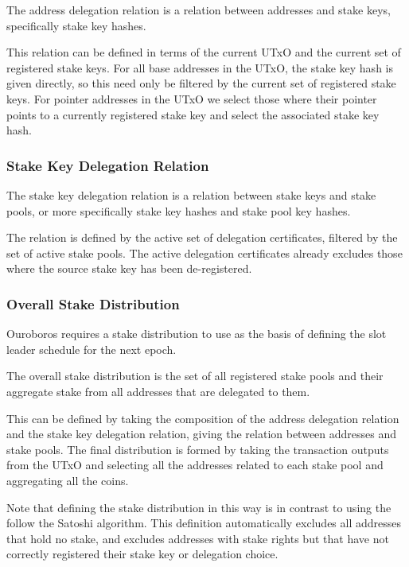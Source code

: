 \documentclass[11pt,a4paper]{article}
\begin{document}
The address delegation relation is a relation between addresses and
stake keys, specifically stake key hashes.

This relation can be defined in terms of the current UTxO and the
current set of registered stake keys. For all base addresses in the
UTxO, the stake key hash is given directly, so this need only be
filtered by the current set of registered stake keys. For pointer
addresses in the UTxO we select those where their pointer points to a
currently registered stake key and select the associated stake key hash.

\subsubsection{Stake Key Delegation Relation}
\label{stake-key-delegation-relation}

The stake key delegation relation is a relation between stake keys and
stake pools, or more specifically stake key hashes and stake pool key
hashes.

The relation is defined by the active set of delegation certificates,
filtered by the set of active stake pools. The active delegation
certificates already excludes those where the source stake key has
been de-registered.

\subsubsection{Overall Stake Distribution}
\label{overall-stake-distribution}

Ouroboros \citep{ouroboros_classic} requires a stake distribution to
use as the basis of defining the slot leader schedule for the next
epoch.

The overall stake distribution is the set of all registered stake pools
and their aggregate stake from all addresses that are delegated to them.

This can be defined by taking the composition of the address delegation
relation and the stake key delegation relation, giving the relation
between addresses and stake pools. The final distribution is formed by
taking the transaction outputs from the UTxO and selecting all the
addresses related to each stake pool and aggregating all the coins.

Note that defining the stake distribution in this way is in contrast to
using the follow the Satoshi algorithm. This definition automatically
excludes all addresses that hold no stake, and excludes addresses with
stake rights but that have not correctly registered their stake key or
delegation choice.
\end{document}

